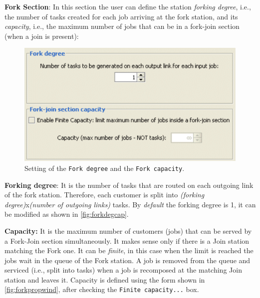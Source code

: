 \noindent \textbf{Fork Section}: In this section the user can
define the station \emph{forking degree}, i.e., the number of
tasks created for each job arriving at the fork station, and its
\emph{capacity}, i.e., the maximum number of jobs that can be in a
fork-join section (when a join is present):
\begin{figure}[htb]
    \begin{center}
        \includegraphics[scale=.5]{img/jsimg/8.21.eps}
    \end{center}
    \caption{Setting of the \texttt{Fork degree} and the \texttt{Fork capacity}.}
    \label{fig:forkdegcap}
\end{figure}
\begin{itemize*}
\item \textbf{Forking degree}: It is the number of tasks that are
routed on each outgoing link of the fork station. Therefore, each
customer is split into \emph{(forking degree)}x\emph{(number of
outgoing links)} tasks. By \emph{default} the forking degree is 1,
it can be modified as shown in \autoref{fig:forkdegcap}. \item
\textbf{Capacity:} It is the maximum number of customers (jobs)
that can be served by a Fork-Join section simultaneously. It makes
sense only if there is a Join station matching the Fork one. It
can be \emph{finite}, in this case when the limit is reached the
jobs wait in the queue of the Fork station. A job is removed from
the queue and serviced (i.e., split into tasks) when a job is
recomposed at the matching Join station and leaves it. Capacity is
defined using the form shown in \autoref{fig:forkpropwind}, after
checking the \texttt{Finite capacity...} box.
\end{itemize*}

